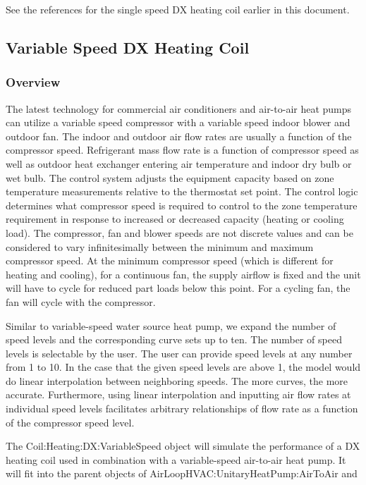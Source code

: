 See the references for the single speed DX heating coil earlier in this document.

\subsection{Variable Speed DX Heating Coil}\label{variable-speed-dx-heating-coil}

\subsubsection{Overview}\label{overview-8-000}

The latest technology for commercial air conditioners and air-to-air heat pumps can utilize a variable speed compressor with a variable speed indoor blower and outdoor fan. The indoor and outdoor air flow rates are usually a function of the compressor speed. Refrigerant mass flow rate is a function of compressor speed as well as outdoor heat exchanger entering air temperature and indoor dry bulb or wet bulb. The control system adjusts the equipment capacity based on zone temperature measurements relative to the thermostat set point. The control logic determines what compressor speed is required to control to the zone temperature requirement in response to increased or decreased capacity (heating or cooling load). The compressor, fan and blower speeds are not discrete values and can be considered to vary infinitesimally between the minimum and maximum compressor speed. At the minimum compressor speed (which is different for heating and cooling), for a continuous fan, the supply airflow is fixed and the unit will have to cycle for reduced part loads below this point. For a cycling fan, the fan will cycle with the compressor.

Similar to variable-speed water source heat pump, we expand the number of speed levels and the corresponding curve sets up to ten. The number of speed levels is selectable by the user. The user can provide speed levels at any number from 1 to 10. In the case that the given speed levels are above 1, the model would do linear interpolation between neighboring speeds. The more curves, the more accurate. Furthermore, using linear interpolation and inputting air flow rates at individual speed levels facilitates arbitrary relationships of flow rate as a function of the compressor speed level.

The Coil:Heating:DX:VariableSpeed object will simulate the performance of a DX heating coil used in combination with a variable-speed air-to-air heat pump. It will fit into the parent objects of AirLoopHVAC:UnitaryHeatPump:AirToAir and

